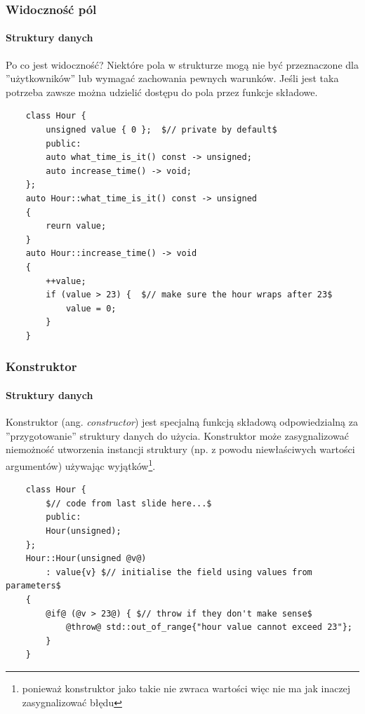 \documentclass[aspectratio=169]{beamer}
\begin{document}
\begin{frame}[fragile]
    \frametitle{Widoczność pól}
    \framesubtitle{Struktury danych}

    Po co jest widoczność? Niektóre pola w strukturze mogą nie być przeznaczone
    dla ''użytkowników'' lub wymagać zachowania pewnych warunków. Jeśli jest
    taka potrzeba zawsze można udzielić dostępu do pola przez funkcje składowe.

    {\tiny
    \begin{lstlisting}
    class Hour {
        unsigned value { 0 };  $// private by default$
        public:
        auto what_time_is_it() const -> unsigned;
        auto increase_time() -> void;
    };
    auto Hour::what_time_is_it() const -> unsigned
    {
        reurn value;
    }
    auto Hour::increase_time() -> void
    {
        ++value;
        if (value > 23) {  $// make sure the hour wraps after 23$
            value = 0;
        }
    }
    \end{lstlisting}}
\end{frame}

\begin{frame}[fragile]
    \frametitle{Konstruktor}
    \framesubtitle{Struktury danych}

    Konstruktor (ang. \textit{constructor}) jest specjalną funkcją składową
    odpowiedzialną za ''przygotowanie'' struktury danych do użycia. Konstruktor
    może zasygnalizować niemożność utworzenia instancji struktury (np. z powodu
    niewłaściwych wartości argumentów) używając wyjątków\footnote{ponieważ
    konstruktor jako takie nie zwraca wartości więc nie ma jak inaczej
    zasygnalizować błędu}.

    {\tiny
    \begin{lstlisting}
    class Hour {
        $// code from last slide here...$
        public:
        Hour(unsigned);
    };
    Hour::Hour(unsigned @v@)
        : value{v} $// initialise the field using values from parameters$
    {
        @if@ (@v > 23@) { $// throw if they don't make sense$
            @throw@ std::out_of_range{"hour value cannot exceed 23"};
        }
    }
    \end{lstlisting}}
\end{frame}

\end{document}
